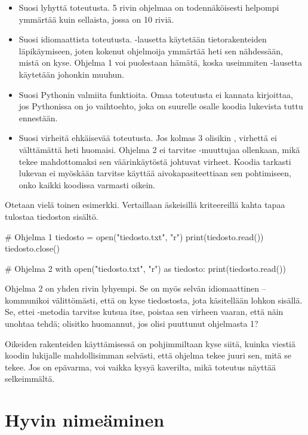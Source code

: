 \begin{itemize}
\item Suosi lyhyttä toteutusta. 5 rivin ohjelmaa on todennäköisesti helpompi ymmärtää kuin sellaista, jossa on 10 riviä.
\item Suosi idiomaattista toteutusta. -lausetta käytetään tietorakenteiden läpikäymiseen, joten kokenut ohjelmoija ymmärtää heti sen nähdessään, mistä on kyse. Ohjelma 1 voi puolestaan hämätä, koska useimmiten -lausetta käytetään johonkin muuhun.
\item Suosi Pythonin valmiita funktioita. Omaa toteutusta ei kannata kirjoittaa, jos Pythonissa on jo vaihtoehto, joka on suurelle osalle koodia lukevista tuttu ennestään.
\item Suosi virheitä ehkäisevää toteutusta. Jos kolmas 3 olisikin , virhettä ei välttämättä heti huomaisi. Ohjelma 2 ei tarvitse -muuttujaa ollenkaan, mikä tekee mahdottomaksi sen väärinkäytöstä johtuvat virheet. Koodia tarkasti lukevan ei myöskään tarvitse käyttää aivokapasiteettiaan sen pohtimiseen, onko kaikki koodissa varmasti oikein.
\end{itemize}

Otetaan vielä toinen esimerkki. Vertaillaan äskeisillä kriteereillä kahta tapaa tulostaa tiedoston sisältö.

\begin{python}
# Ohjelma 1
tiedosto = open("tiedosto.txt", "r")
print(tiedosto.read())
tiedosto.close()

# Ohjelma 2
with open("tiedosto.txt", "r") as tiedosto:
	print(tiedosto.read())
\end{python}

Ohjelma 2 on yhden rivin lyhyempi. Se on myös selvän idiomaattinen --  kommunikoi välittömästi, että on kyse tiedostosta, jota käsitellään lohkon sisällä. Se, ettei -metodia tarvitse kutsua itse, poistaa sen virheen vaaran, että näin unohtaa tehdä; olisitko huomannut, jos  olisi puuttunut ohjelmasta 1?

Oikeiden rakenteiden käyttämisessä on pohjimmiltaan kyse siitä, kuinka viestiä koodin lukijalle mahdollisimman selvästi, että ohjelma tekee juuri sen, mitä se tekee. Jos on epävarma, voi vaikka kysyä kaverilta, mikä toteutus näyttää selkeimmältä.

\section{Hyvin nimeäminen}

